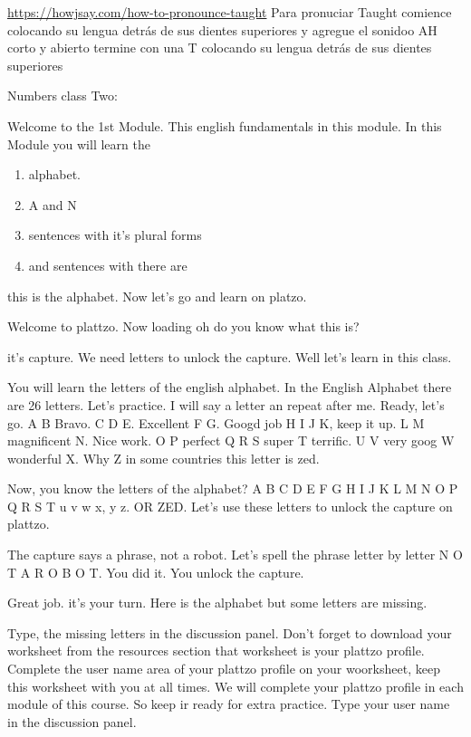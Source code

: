 \url{https://howjsay.com/how-to-pronounce-taught}
Para pronuciar Taught comience colocando su lengua detr\'as de sus dientes superiores y agregue el sonidoo AH corto y abierto termine con una T colocando su lengua detr\'as de sus dientes superiores



Numbers class Two: 

Welcome to the 1st Module. This english fundamentals in this module.
In this Module you will learn the 
\begin{enumerate}
	\item alphabet.
	\item A and N 
	\item sentences with it's plural forms
	\item  and sentences with there are
\end{enumerate}
 this is the alphabet. Now let's go and learn on platzo.
 
 Welcome to plattzo. Now loading oh do you know what this is?
 
 it's capture. We need letters to unlock the capture. Well let's learn in this class. 
 
 You will learn the letters of the english alphabet. In the English Alphabet there are 26 letters. Let's practice. I will say a letter an repeat after me. Ready, let's go. A B Bravo. C D E. Excellent F G. Googd job H I J K, keep it up. L M magnificent N. Nice work. O P perfect Q R S super T terrific. U V very goog W wonderful X. Why Z in some countries this letter is zed.
 
 Now, you know the letters of the alphabet? A B C D E F G H I J K L M N O P Q R S T u v w x, y z. OR ZED. 	Let's use these letters to unlock the capture on plattzo.
 
 The capture says a phrase, not a robot. Let's spell the phrase letter by letter N O T A R O B O T. You did it. You unlock the capture. 
 
 Great job. it's your turn. Here is the alphabet but some letters are missing. 
 
 Type, the missing letters in the discussion panel. 
 Don't forget to download your worksheet from the resources section that worksheet is your plattzo profile. Complete the user name area of your plattzo profile on your woorksheet, keep this worksheet with you at all times. We will complete your plattzo profile in each module of this course. So keep ir ready for extra practice. Type your user name in the discussion panel.
 
